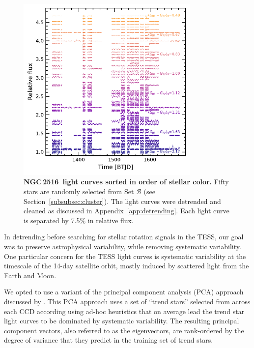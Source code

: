 \documentclass[12pt,twocolumn,tighten]{aastex63}
\newcommand{\cn}{NGC\,2516} %
\begin{document}
\begin{figure}[b]
	\begin{center}
		\leavevmode
		\includegraphics[width=0.8\textwidth]{f14.pdf}
	\end{center}
	\vspace{-1cm}
  \caption{ {\bf \cn\ light curves sorted in order
  of stellar color.} Fifty stars are randomly selected from Set
  $\mathcal{B}$ (see Section~\ref{subsubsec:cluster}). The light
  curves were detrended and cleaned as discussed in
  Appendix~\ref{app:detrending}.  Each light curve is separated by
  7.5\% in relative flux.  \label{fig:lightcurves}
	}
\end{figure}



In detrending before searching for stellar rotation signals in the
TESS, our goal was to preserve astrophysical variability, while
removing systematic variability.  One particular concern for the TESS
light curves is systematic variability at the timescale of the 14-day
satellite orbit, mostly induced by scattered light from the Earth and
Moon.

We opted to use a variant of the principal component analysis (PCA)
approach discussed by \citet{bouma_cdipsI_2019}. This PCA approach
uses a set of ``trend stars'' selected from across each CCD according
using ad-hoc heuristics that on average lead the trend star light
curves to be dominated by systematic variability.  The resulting
principal component vectors, also referred to as the eigenvectors, are
rank-ordered by the degree of variance that they predict in the
training set of trend stars.
\end{document}
